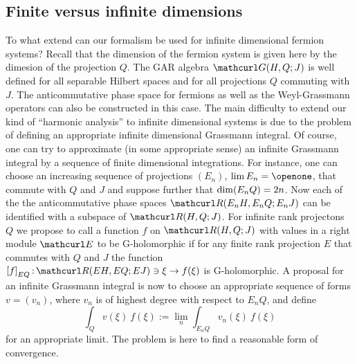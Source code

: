 \documentclass[pra,twoside,amsmath,amsfonts,amssymb,superscriptaddress,showpacs]{revtex4}
\def\8#1{{\rm #1}}
\def\9#1{{\mathcurl #1}}
\def\I{\openone}
\newcommand{\GAR}[3]{\9G(#1,#3;#2)}
\newcommand{\PHSP}[3]{\9R(#1,#3;#2)}
\newcommand{\EQ}[2]{\left[#1\right]_{#2}}
\begin{document}
\subsection{Finite versus infinite dimensions}
\label{subsec:finite-infinite}
To what extend can our formalism be used for infinite
dimensional fermion systems? Recall that the dimension of the fermion system is given here by the
dimesion of the projection $Q$. The GAR algebra $\GAR{H}{J}{Q}$ is well defined for all separable
Hilbert spaces and for all projections $Q$ commuting with $J$. The anticommutative phase space for
fermions as well as the Weyl-Grassmann operators can also be constructed in this case. The main
difficulty to extend our kind of ``harmonic analysis'' to infinite dimensional systems is due to the
problem of defining an appropriate infinite dimensional Grassmann integral. Of course, one can try
to approximate (in some appropriate sense) an infinite Grassmann integral by a sequence of finite
dimensional integrations. For instance, one can choose an increasing sequence of projections
$(E_n)$, $\lim E_n=\I$,  that commute with $Q$ and $J$ and suppose further that $\8{dim}(E_nQ)=2n$.
Now each of the the anticommutative phase spaces $\PHSP{E_nH}{E_nJ}{E_nQ}$ can be identified with a
subspace of $\PHSP{H}{J}{Q}$. For infinite rank projectons $Q$ we propose to call a function $f$ on
$\PHSP{H}{J}{Q}$ with values in a right module $\9E$ to be G-holomorphic if for any finite rank
projection $E$ that commutes with $Q$ and $J$ the function 
$\EQ{f}{EQ}\mathpunct:\PHSP{EH}{EJ}{EQ}\ni\xi\to f(\xi)$ is G-holomorphic. A proposal for an
infinite Grassmann integral is now to choose an appropriate sequence of forms
$v=(v_n)$, where $v_n$ is of highest degree with respect to $E_nQ$, and define
\begin{equation}
\label{eq:inf-dim-int}
\int_Q v(\xi) \ f(\xi) :=\lim_{n} \int_{E_nQ} v_n(\xi) \ f(\xi)
\end{equation}
for an appropriate limit. The problem is here to find a reasonable form of convergence.
\end{document}
